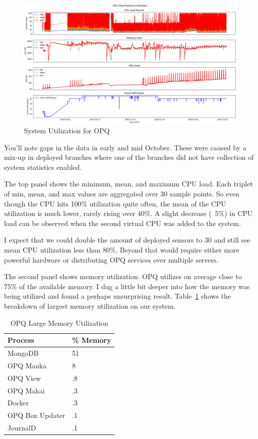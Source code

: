 \begin{figure}[H]
    \centering
    \includegraphics[width=\linewidth]{figures/actual_system_opq.png}
    \caption{System Utilization for OPQ}
    \label{fig:actual_system_opq}
\end{figure}

You'll note gaps in the data in early and mid October. These were caused by a mix-up in deployed branches where one of the branches did not have collection of system statistics enabled.

The top panel shows the minimum, mean, and maximum CPU load. Each triplet of min, mean, and max values are aggregated over 30 sample points. So even though the CPU hits 100\% utilization quite often, the mean of the CPU utilization is much lower, rarely rising over 40\%. A slight decrease (~5\%) in CPU load can be observed when the second virtual CPU was added to the system.

I expect that we could double the amount of deployed sensors to 30 and still see mean CPU utilization less than 80\%. Beyond that would require either more powerful hardware or distributing OPQ services over multiple servers.

The second panel shows memory utilization. OPQ utilizes on average close to 75\% of the available memory. I dug a little bit deeper into how the memory was being utilized and found a perhaps unsurprising result. Table~\ref{table:mem_utilization} shows the breakdown of largest memory utilization on our system.

\begin{table}[H]
    \centering
    \caption{OPQ Large Memory Utilization}
    \begin{tabularx}{\textwidth}{Xl}
        \toprule
        \textbf{Process} & \textbf{\% Memory} \\
        \midrule
        MongoDB & 51 \\
        OPQ Mauka & 8 \\
        OPQ View & .8 \\
        OPQ Makai & .3 \\
        Docker & .3 \\
        OPQ Box Updater & .1 \\
        JournalD & .1 \\
        \bottomrule
    \end{tabularx}
    \label{table:mem_utilization}
\end{table}

